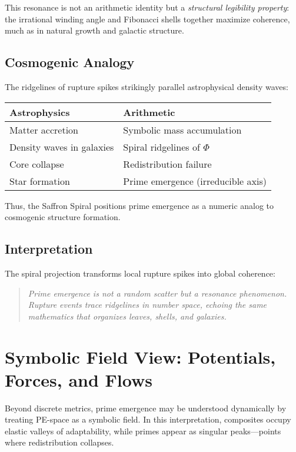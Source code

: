 \documentclass[11pt]{article}
\theoremstyle{plain}
\theoremstyle{definition}
\begin{document}
This resonance is not an arithmetic identity but a \emph{structural legibility property}: the irrational winding angle and Fibonacci shells together maximize coherence, much as in natural growth and galactic structure.

\subsection{Cosmogenic Analogy}
The ridgelines of rupture spikes strikingly parallel astrophysical density waves:
\begin{center}
\begin{tabular}{ll}
\textbf{Astrophysics} & \textbf{Arithmetic} \\
\hline
Matter accretion & Symbolic mass accumulation \\
Density waves in galaxies & Spiral ridgelines of $\Phi$ \\
Core collapse & Redistribution failure \\
Star formation & Prime emergence (irreducible axis) \\
\end{tabular}
\end{center}
Thus, the Saffron Spiral positions prime emergence as a numeric analog to cosmogenic structure formation.

\subsection{Interpretation}
The spiral projection transforms local rupture spikes into global coherence:
\begin{quote}
\emph{Prime emergence is not a random scatter but a resonance phenomenon.  
Rupture events trace ridgelines in number space, echoing the same mathematics that organizes leaves, shells, and galaxies.}
\end{quote}

\section{Symbolic Field View: Potentials, Forces, and Flows}

Beyond discrete metrics, prime emergence may be understood dynamically by treating PE-space as a symbolic field. In this interpretation, composites occupy elastic valleys of adaptability, while primes appear as singular peaks—points where redistribution collapses.
\end{document}
